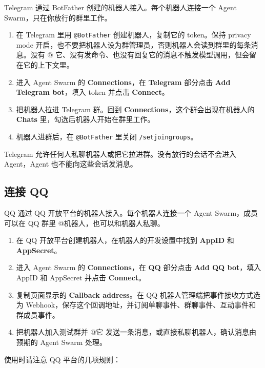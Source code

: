 \documentclass[UTF8,a4paper,11pt]{ctexart}
\begin{document}
Telegram 通过 BotFather 创建的机器人接入。每个机器人连接一个 Agent Swarm，只在你放行的群里工作。

\begin{enumerate}
  \item 在 Telegram 里用 \texttt{@BotFather} 创建机器人，复制它的 token。保持 privacy mode 开启，也不要把机器人设为群管理员，否则机器人会读到群里的每条消息。没有 @ 它、没有发命令、也没有回复它的消息不触发模型调用，但会留在它的上下文里。
  \item 进入 Agent Swarm 的 \textbf{Connections}，在 \textbf{Telegram} 部分点击 \textbf{Add Telegram bot}，填入 token 并点击 \textbf{Connect}。
  \item 把机器人拉进 Telegram 群。回到 \textbf{Connections}，这个群会出现在机器人的 \textbf{Chats} 里，勾选后机器人开始在群里工作。
  \item 机器人进群后，在 \texttt{@BotFather} 里关闭 \texttt{/setjoingroups}。
\end{enumerate}

Telegram 允许任何人私聊机器人或把它拉进群。没有放行的会话不会进入 Agent，Agent 也不能向这些会话发消息。

\subsection{连接 QQ}

QQ 通过 QQ 开放平台的机器人接入。每个机器人连接一个 Agent Swarm，成员可以在 QQ 群里 @机器人，也可以和机器人私聊。

\begin{enumerate}
  \item 在 QQ 开放平台创建机器人，在机器人的开发设置中找到 \textbf{AppID} 和 \textbf{AppSecret}。
  \item 进入 Agent Swarm 的 \textbf{Connections}，在 \textbf{QQ} 部分点击 \textbf{Add QQ bot}，填入 AppID 和 AppSecret 并点击 \textbf{Connect}。
  \item 复制页面显示的 \textbf{Callback address}。在 QQ 机器人管理端把事件接收方式选为 Webhook，保存这个回调地址，并订阅单聊事件、群聊事件、互动事件和群成员事件。
  \item 把机器人加入测试群并 @它 发送一条消息，或直接私聊机器人，确认消息由预期的 Agent Swarm 处理。
\end{enumerate}

使用时请注意 QQ 平台的几项规则：
\end{document}

